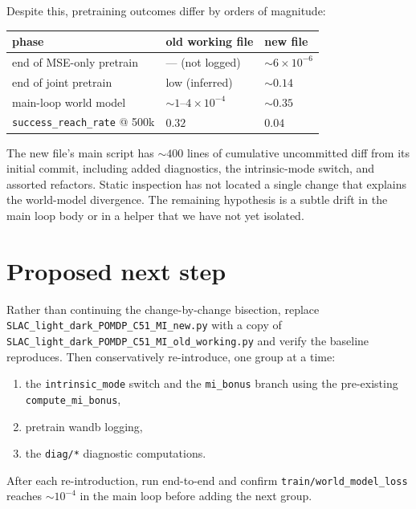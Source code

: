 \documentclass[11pt,a4paper]{article}
\begin{document}
Despite this, pretraining outcomes differ by orders of magnitude:

\begin{center}
\begin{tabular}{lll}
\toprule
phase & old working file & new file \\
\midrule
end of MSE-only pretrain  & --- (not logged)             & $\sim 6 \times 10^{-6}$ \\
end of joint pretrain     & low (inferred)               & $\sim 0.14$             \\
main-loop world model     & $\sim 1\text{--}4 \times 10^{-4}$ & $\sim 0.35$        \\
\texttt{success\_reach\_rate} @ 500k & $0.32$                       & $0.04$ \\
\bottomrule
\end{tabular}
\end{center}

The new file's main script has $\sim 400$ lines of cumulative uncommitted diff
from its initial commit, including added diagnostics, the intrinsic-mode
switch, and assorted refactors. Static inspection has not located a single
change that explains the world-model divergence. The remaining hypothesis is
a subtle drift in the main loop body or in a helper that we have not yet
isolated.

\section{Proposed next step}

Rather than continuing the change-by-change bisection, replace
\texttt{SLAC\_light\_dark\_POMDP\_C51\_MI\_new.py} with a copy of
\texttt{SLAC\_light\_dark\_POMDP\_C51\_MI\_old\_working.py} and verify the
baseline reproduces. Then conservatively re-introduce, one group at a time:
\begin{enumerate}[leftmargin=*]
  \item the \texttt{intrinsic\_mode} switch and the \texttt{mi\_bonus} branch
        using the pre-existing \texttt{compute\_mi\_bonus},
  \item pretrain wandb logging,
  \item the \texttt{diag/*} diagnostic computations.
\end{enumerate}
After each re-introduction, run end-to-end and confirm
\texttt{train/world\_model\_loss} reaches $\sim 10^{-4}$ in the main loop
before adding the next group.
\end{document}
